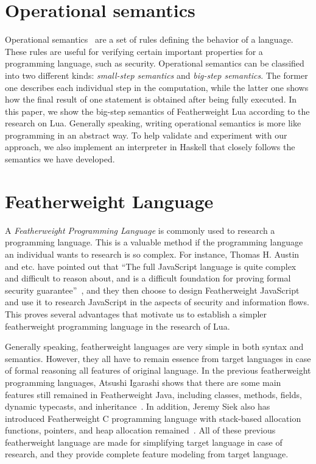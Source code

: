 \section{Operational semantics}
Operational semantics~\cite{AIOS} are a set of rules defining the behavior of a language.
These rules are useful for verifying certain important properties for a programming language, such as security. Operational semantics can be classified into two different kinds: \emph{small-step semantics} and \emph{big-step semantics}. The former one describes each individual step in the computation, while the latter one shows how the final result of one statement is obtained after being fully executed. In this paper, we show the big-step semantics of Featherweight Lua according to the research on Lua. Generally speaking, writing operational semantics is more like programming in an abstract way. To help validate and experiment with our approach, we also implement an interpreter in Haskell that closely follows the semantics we have developed.

\section{Featherweight Language}
A \emph{Featherweight Programming Language} is commonly used to research a programming language.
This is a valuable method if the programming language an individual wants to research is so complex. For instance, Thomas H. Austin and etc. have pointed out that ``The full JavaScript language is quite complex and difficult to reason about, and is a difficult foundation for proving formal security guarantee''~\cite{FWJS}, and they then choose to design Featherweight JavaScript and use it to research JavaScript in the aspects of security and information flows. This proves several advantages that motivate us to establish a simpler featherweight programming language in the research of Lua.

Generally speaking, featherweight languages are very simple in both syntax and semantics. However, they all have to remain essence from target languages in case of formal reasoning all features of original language. In the previous featherweight programming languages, Atsushi Igarashi shows that there are some main features still remained in Featherweight Java, including classes, methods, fields, dynamic typecasts, and inheritance~\cite{FWJV}. In addition, Jeremy Siek also has introduced Featherweight C programming language with stack-based allocation functions, pointers, and heap allocation remained~\cite{FWC}. All of these previous featherweight language are made for simplifying target language in case of research, and they provide complete feature modeling from target language.




